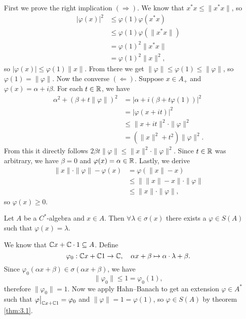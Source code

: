 \begin{myproof}
  First we prove the right implication $(\Rightarrow)$. We know that $x^* x \leq \|x^* x\|$, so 
  \begin{align*}
    |\varphi(x)|^2 &\leq \varphi(1) \varphi(x^* x)\\
    &\leq \varphi(1) \varphi(\| x^* x\|)\\
    &= \varphi(1)^2 \|x^* x\|\\
    &= \varphi(1)^2 \|x\|^2,
  \end{align*}
  so $|\varphi(x)| \leq \varphi(1) \|x\|$. From there we get $\| \varphi \| \leq \varphi(1) \leq \|\varphi\|$,
  so $\varphi(1) = \| \varphi \|$. Now the converse $(\Leftarrow)$. Suppose $x \in A_+$ and $\varphi (x) = \alpha + i \beta.$
  For each $t \in \mathbb {R}$, we have 
  \begin{align*}
    \alpha^2 + (\beta + t \|\varphi\|)^2 &= |\alpha + i (\beta + t \varphi(1))|^2\\
    &= |\varphi (x + it)|^2\\
    &\leq \| x + it\|^2 \cdot \|\varphi\|^2 \\
    &= \left( \|x\|^2 + t^2 \right) \|\varphi\|^2. 
  \end{align*}
  From this it directly follows $2 \beta t \|\varphi\| \leq \|x\|^2 \cdot \|\varphi\|^2$.
  Since $t \in \mathbb {R}$ was arbitrary, we have $\beta = 0$ and $\varphi(x) = \alpha \in \mathbb {R}$.
  Lastly, we derive 
  \begin{align*}
    \| x\| \cdot \|\varphi\| - \varphi(x) &= \varphi(\|x\| - x)\\
    &\leq \|\|x\| - x\| \cdot \|\varphi\|\\
    &\leq \| x\| \cdot \| \varphi \|,
  \end{align*}
  so $\varphi(x) \geq 0$.
\end{myproof}

\begin{proposition}
  Let $A$ be a $C^*$-algebra and $x \in A$. Then $\forall \lambda \in \sigma(x)$ there exists a $\varphi \in S(A)$
  such that $\varphi(x) = \lambda$.
\end{proposition}

\begin{myproof}
  We know that $\mathbb {C} x + \mathbb {C} \cdot 1 \subseteq A$.
  Define $$\varphi_0 : \mathbb {C} x+ \mathbb {C} 1 \to \mathbb {C},\quad \alpha x + \beta \mapsto \alpha \cdot \lambda + \beta.$$
  Since $\varphi_0 (\alpha x + \beta) \in \sigma(\alpha x + \beta)$, we have
  $$\|\varphi_0 \| \leq 1 = \varphi_0 (1),$$
  therefore $\|\varphi_0\| = 1$. Now we apply Hahn--Banach to get an extension $\varphi \in A^*$
  such that $\varphi\big|_{\mathbb {C} x + \mathbb {C} 1} = \varphi_0$ and $\| \varphi \| = 1 = \varphi(1)$,
  so $\varphi \in S(A)$ by theorem \ref{thm:3.1}.
\end{myproof}

